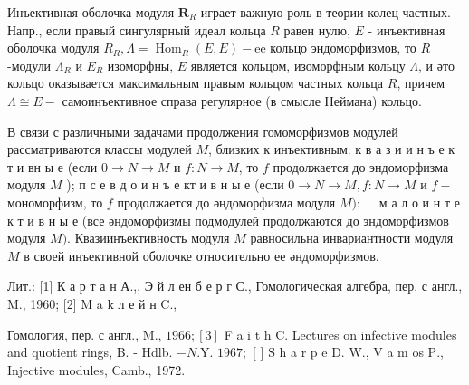 \documentclass[10pt]{article}
\begin{document}
Инъективная оболочка модуля $\boldsymbol{R}_{R}$ играет важную роль в теории колец частных. Напр., если правый сингулярный идеал кольца $R$ равен нулю, $E$ - инъективная оболочка модуля $R_{R}, \Lambda=\operatorname{Hom}_{R}(E, E)-\mathrm{ee}$ кольцо эндоморфизмов, то $R$-модули $\Lambda_{R}$ и $E_{R}$ изоморфны, $E$ является кольцом, изоморфным кольцу $\Lambda$, и әто кольцо оказывается максимальным правым кольцом частных кольца $R$, причем $\Lambda \cong E-$ самоинъективное справа регулярное (в смысле Неймана) кольцо.



В связи с различными задачами продолжения гомоморфизмов модулей рассматриваются классы модулей $M$, близких к инъективным: к в а з и и н ъ е к т и вн ы е (если $0 \rightarrow N \rightarrow M$ и $f: N \rightarrow M$, то $f$ продолжается до эндоморфизма модуля $M$ ); п с е в д о и н ъ е кт и в н ы е (если $0 \rightarrow N \rightarrow M, f: N \rightarrow M$ и $f-$ мономорфизм, то $f$ продолжается до әндоморфизма модуля $M): \quad$ м а л о и н т е к т и в н ы е (все әндоморфизмы подмодулей продолжаются до эндоморфизмов модуля $M)$. Квазиинъективность модуля $M$ равносильна инвариантности модуля $M$ в своей инъективной оболочке относительно ее әндоморфизмов.



Лит.: [1] К а р т а н А.,, Э й л ен б е р г С., Гомологическая алгебра, пер. с англ., M., 1960; [2] M a k л е й н C.,

Гомология, пер. с англ., M., $1966 ;[3]$ F a i t h C. Lectures on infective modules and quotient rings, B. - Hdlb. $-N$.Y. $1967 ;$ [ ] $\mathrm{S}$ h a r p e D. W., V a m os $\mathrm{P}$., Injective modules, Camb., 1972.
\end{document}
